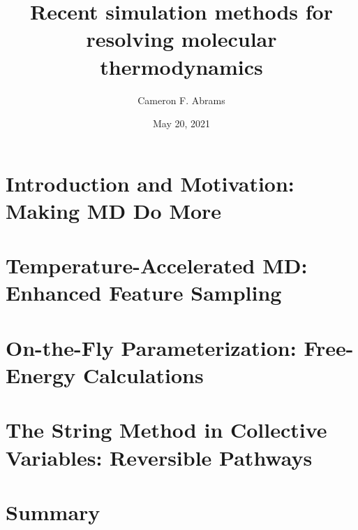 \documentclass[10pt]{beamer}
\title{Recent simulation methods for resolving molecular thermodynamics}
\date{May 20, 2021}
\author{Cameron F. Abrams}
\institute{Drexel University, Department of Chemical and Biological Engineering}
\begin{document}
\maketitle

\section{Introduction and Motivation:  Making MD Do More}











\section{Temperature-Accelerated MD: Enhanced Feature Sampling}





\section{On-the-Fly Parameterization:  Free-Energy Calculations}













%

\section{The String Method in Collective Variables: Reversible Pathways}












\section{Summary}
\end{document}

